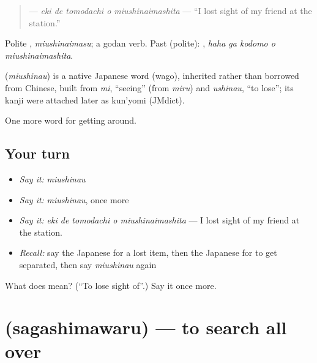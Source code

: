 \begin{quote}
\textbf{  } — \emph{eki de tomodachi o miushinaimashita} — \textquotedblleft{}I lost sight of my friend at the station.\textquotedblright{}
\end{quote}

Polite \textbf{}, \emph{miushinaimasu}; a godan verb. Past (polite): \textbf{  }, \emph{haha ga kodomo o miushinaimashita}.

\begin{cousinweb}
\textbf{} (\emph{miushinau}) is a native Japanese word (wago), inherited rather than borrowed from Chinese, built from \emph{mi}, \textquotedblleft{}seeing\textquotedblright{} (from \emph{miru}) and \emph{ushinau}, \textquotedblleft{}to lose\textquotedblright{}; its kanji were attached later as kun'yomi (JMdict).
\end{cousinweb}

\begin{grammarlens}[title={What you've built}]
One more word for getting around.
\end{grammarlens}

\subsection*{Your turn}
\begin{itemize}
\raggedright
  \item \emph{Say it:} \emph{miushinau}
  \item \emph{Say it:} \emph{miushinau}, once more
  \item \emph{Say it:} \emph{eki de tomodachi o miushinaimashita} — I lost sight of my friend at the station.
  \item \emph{Recall:} say the Japanese for a lost item, then the Japanese for to get separated, then say \emph{miushinau} again
\end{itemize}

\begin{tcolorbox}[breakable,colback=teal!4,colframe=teal!35!black,title={Before you move on}]
What does  mean? (\textquotedblleft{}To lose sight of\textquotedblright{}.) Say it once more.
\end{tcolorbox}
\section[\texorpdfstring{\ja{さがしまわる} (sagashimawaru)}{さがしまわる (sagashimawaru)}]{ (sagashimawaru) — to search all over}

